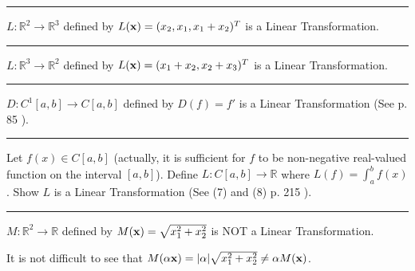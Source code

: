 \rule[0.01in]{\textwidth}{0.0025in}







\begin{example}
$L:\mathbb{R}^2 \to \mathbb{R}^3$ defined by $L({\bf x}) = (x_2, x_1, x_1+x_2)^T$  is a Linear Transformation.  
\end{example}

\rule[0.01in]{\textwidth}{0.0025in}







\begin{example}
$L:\mathbb{R}^3 \to \mathbb{R}^2$ defined by $L({\bf x}) = (x_1+x_2, x_2+x_3)^T$  is a Linear Transformation.  
\end{example}

\rule[0.01in]{\textwidth}{0.0025in}










\begin{example}
$D:C^1[a,b] \to C[a,b]$ defined by $D(f) =f'$  is a Linear Transformation (See p. 85 \cite{simmons1996calculus}).
\end{example}

\rule[0.01in]{\textwidth}{0.0025in}









\begin{example}
Let $f(x) \in C[a,b]$ (actually, it is sufficient for $f$ to be non-negative real-valued function on the interval $[a, b]$).  Define $L:C[a,b] \to \mathbb{R}$ where $L(f) =\int_a^b f(x)$.  Show $L$  is a Linear Transformation (See (7) and (8) p. 215 \cite{simmons1996calculus}).
\end{example}

\rule[0.01in]{\textwidth}{0.0025in}






\begin{example}
$M:\mathbb{R}^2 \to \mathbb{R}$ defined by $M({\bf x}) = \sqrt{x_1^2 + x_2^2}$  is NOT a Linear Transformation.  

It is not difficult to see that $M(\alpha {\bf x}) =| \alpha | \sqrt{x_1^2 +x_2^2} \ne \alpha M({\bf x})$. 
\end{example}

